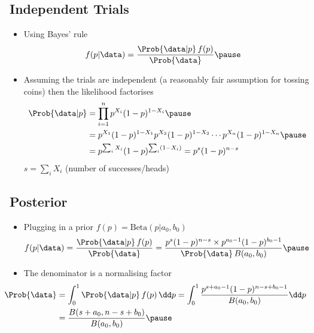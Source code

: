 
\begin{slide}
\section[-2]{Independent Trials}

\begin{PauseHighLight}
  \begin{itemize}
  \item Using Bayes' rule
    \begin{align*}
      f(p|\data) &= \frac{ \Prob{\data| p}\, f(p) }{ \Prob{\data} }\pause
    \end{align*}
  \item Assuming the trials are independent (a reasonably fair
    assumption for tossing coins) then the likelihood factorises
    \begin{align*}
      \Prob{\data| p} &= \prod_{i=1}^n p^{X_i} (1-p)^{1-X_i}\pause
      \\
      &= p^{X_1} (1-p)^{1-X_1} p^{X_2} (1-p)^{1-X_2}
      \cdots p^{X_n} (1-p)^{1-X_n}\pause
      \\
      &= p^{\sum_i X_i} (1-p)^{\sum_i (1-X_i)} = p^s (1-p)^{n-s}
    \end{align*}
    $s = \sum_i X_i$ (number of successes/heads)\pause
  \end{itemize}
\end{PauseHighLight}

\end{slide}


\begin{slide}
\section{Posterior}

\begin{PauseHighLight}
  \begin{itemize}
  \item Plugging in a prior $f(p) = \mathrm{Beta}(p|a_0,b_0)$
    \begin{align*}
      f(p|\data) &= 
      \frac{ \Prob{\data| p}\, f(p) }{ \Prob{\data} }
      = \frac{p^s (1-p)^{n-s}  \times p^{a_0-1} (1-p)^{b_0-1} }{
                   \Prob{\data} \, B(a_0,b_0) }\pause
    \end{align*}
  \item The denominator is a normalising factor
    \begin{align*}
     \hspace{-1cm} \Prob{\data} &= \int_0^1  \Prob{\data| p}\, f(p) \, \dd p =
      \int_0^1 \frac{p^{s+a_0-1} (1-p)^{n-s+b_0-1}}{B(a_0,b_0)} \dd p \\
      &= \frac{B(s+a_0,n-s+b_0)}{B(a_0,b_0)}\pause
    \end{align*}
  \end{itemize}
\end{PauseHighLight}

\end{slide}

